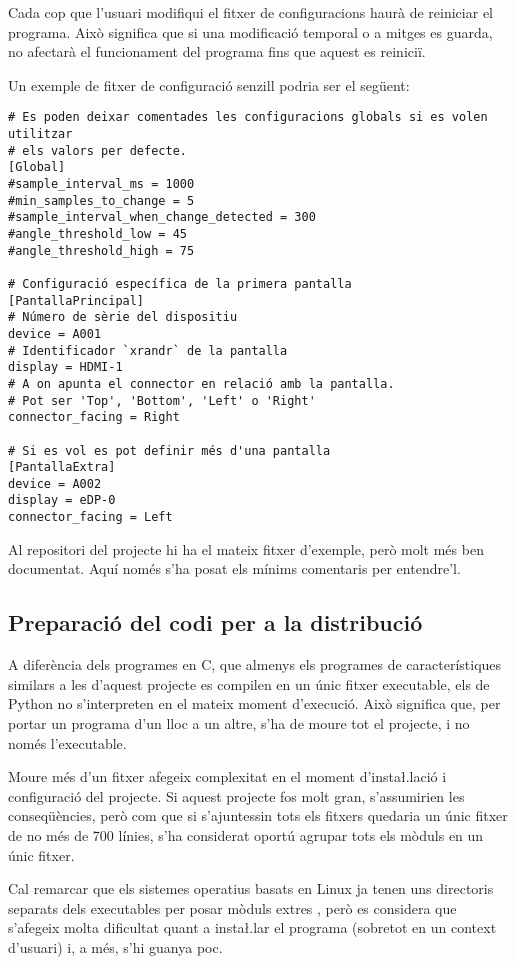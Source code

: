 Cada cop que l'usuari modifiqui el fitxer de configuracions haurà de reiniciar
el programa. Això significa que si una modificació temporal o a mitges es guarda,
no afectarà el funcionament del programa fins que aquest es reiniciï.

Un exemple de fitxer de configuració senzill podria ser el següent:

\begin{verbatim}
# Es poden deixar comentades les configuracions globals si es volen utilitzar
# els valors per defecte.
[Global]
#sample_interval_ms = 1000
#min_samples_to_change = 5
#sample_interval_when_change_detected = 300
#angle_threshold_low = 45
#angle_threshold_high = 75

# Configuració específica de la primera pantalla
[PantallaPrincipal]
# Número de sèrie del dispositiu
device = A001
# Identificador `xrandr` de la pantalla
display = HDMI-1
# A on apunta el connector en relació amb la pantalla.
# Pot ser 'Top', 'Bottom', 'Left' o 'Right'
connector_facing = Right

# Si es vol es pot definir més d'una pantalla
[PantallaExtra]
device = A002
display = eDP-0
connector_facing = Left
\end{verbatim}

Al repositori del projecte hi ha el mateix fitxer d'exemple, però molt més ben
documentat. Aquí només s'ha posat els mínims comentaris per entendre'l.

\subsection{Preparació del codi per a la distribució}

A diferència dels programes en C, que almenys els programes de característiques
similars a les d'aquest projecte es compilen en un únic fitxer executable, els
 de Python no s'interpreten en el mateix moment d'execució. Això
significa que, per portar un programa d'un lloc a un altre, s'ha de moure tot
el projecte, i no només l'executable.

Moure més d'un fitxer afegeix complexitat en el moment d'insta\l.lació i
configuració del projecte. Si aquest projecte fos molt gran, s'assumirien les
conseqüències, però com que si s'ajuntessin tots els fitxers quedaria un únic
fitxer de no més de 700 línies, s'ha considerat oportú agrupar tots els mòduls
en un únic fitxer.

Cal remarcar que els sistemes operatius basats en Linux ja tenen uns directoris
separats dels executables per posar mòduls extres \cite{InstallPython3},
però es considera que
s'afegeix molta dificultat quant a insta\l.lar el programa (sobretot en un
context d'usuari) i, a més, s'hi guanya poc.

